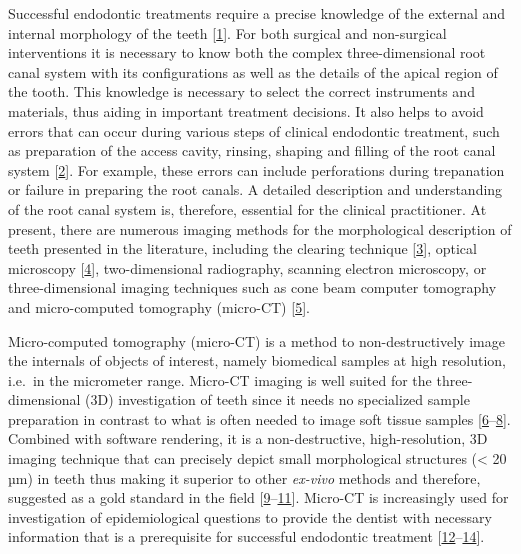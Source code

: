 \documentclass[
  american,
]{article}
\begin{document}
Successful endodontic treatments require a precise knowledge of the external and internal morphology of the teeth {[}\protect\hyperlink{ref-q3HKadWY}{1}{]}.
For both surgical and non-surgical interventions it is necessary to know both the complex three-dimensional root canal system with its configurations as well as the details of the apical region of the tooth.
This knowledge is necessary to select the correct instruments and materials, thus aiding in important treatment decisions.
It also helps to avoid errors that can occur during various steps of clinical endodontic treatment, such as preparation of the access cavity, rinsing, shaping and filling of the root canal system {[}\protect\hyperlink{ref-AHVImOFB}{2}{]}.
For example, these errors can include perforations during trepanation or failure in preparing the root canals.
A detailed description and understanding of the root canal system is, therefore, essential for the clinical practitioner.
At present, there are numerous imaging methods for the morphological description of teeth presented in the literature, including the clearing technique {[}\protect\hyperlink{ref-11Kln4Lf0}{3}{]}, optical microscopy {[}\protect\hyperlink{ref-gA7iMD0q}{4}{]}, two-dimensional radiography, scanning electron microscopy, or three-dimensional imaging techniques such as cone beam computer tomography and micro-computed tomography (micro-CT) {[}\protect\hyperlink{ref-1HkTk4VKM}{5}{]}.

Micro-computed tomography (micro-CT) is a method to non-destructively image the internals of objects of interest, namely biomedical samples at high resolution, i.e.~in the micrometer range.
Micro-CT imaging is well suited for the three-dimensional (3D) investigation of teeth since it needs no specialized sample preparation in contrast to what is often needed to image soft tissue samples {[}\protect\hyperlink{ref-XahGmSLJ}{6}--\protect\hyperlink{ref-6C8eCzkj}{8}{]}.
Combined with software rendering, it is a non-destructive, high-resolution, 3D imaging technique that can precisely depict small morphological structures (\textless{} 20 µm) in teeth thus making it superior to other \emph{ex-vivo} methods and therefore, suggested as a gold standard in the field {[}\protect\hyperlink{ref-pTcCEU9H}{9}--\protect\hyperlink{ref-19T8cyNhk}{11}{]}.
Micro-CT is increasingly used for investigation of epidemiological questions to provide the dentist with necessary information that is a prerequisite for successful endodontic treatment {[}\protect\hyperlink{ref-OttTicsv}{12}--\protect\hyperlink{ref-RUBxFFUa}{14}{]}.
\end{document}
